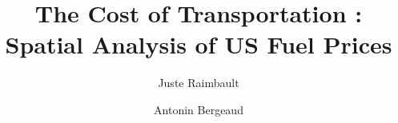 \documentclass[3p,times,procedia]{elsarticle}
\begin{document}
\begin{frontmatter}




\title{The Cost of Transportation : Spatial Analysis of US Fuel Prices}




\author[a,b]{Juste Raimbault}
\author[c,d]{Antonin Bergeaud}

\address[a]{UMR CNRS 8504 G{\'e}ographie-cit{\'e}s, 13 rue du Four, Paris, France}
\address[b]{UMR-T IFSTTAR 9403 LVMT, Cit{\'e} Descartes, Champs-sur-Marne, France}
\address[c]{Banque de France, Paris, France}
\address[d]{Paris School of Economics - EHESS, Paris, France}



\end{frontmatter}
\end{document}
